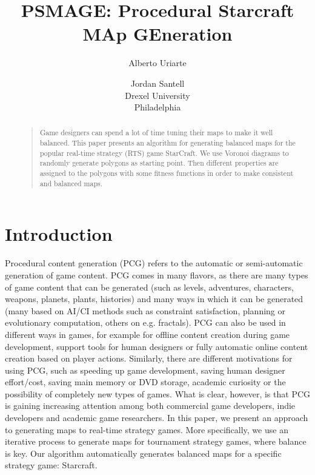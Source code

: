 \documentclass[letterpaper]{article}
\begin{document}
%
\title{PSMAGE: Procedural Starcraft MAp GEneration}
\author{Alberto Uriarte \and Jordan Santell\\
Drexel University\\
Philadelphia\\
}
\maketitle
\begin{abstract}
\begin{quote}
Game designers can spend a lot of time tuning their maps to make it well balanced. This paper presents an algorithm for generating balanced maps for the popular real-time strategy (RTS) game StarCraft. We use Voronoi diagrams to randomly generate polygons as starting point. Then different properties are assigned to the polygons with some fitness functions in order to make consistent and balanced maps.
\end{quote}
\end{abstract}


\section{Introduction} %
\label{sec:introduction}
Procedural content generation (PCG) refers to the automatic or semi-automatic generation of game content. PCG comes in many ﬂavors, as there are many types of game content that can be generated (such as levels, adventures, characters, weapons, planets, plants, histories) and many ways in which it can be generated (many based on AI/CI methods such as constraint satisfaction, planning or evolutionary computation, others on e.g. fractals). PCG can also be used in different ways in games, for example for offline content creation during game development, support tools for human designers or fully automatic online content creation based on player actions. Similarly, there are different motivations for using PCG, such as speeding up game development, saving human designer effort/cost, saving main memory or DVD storage, academic curiosity or the possibility of completely new types of games. What is clear, however, is that PCG is gaining increasing attention among both commercial game developers, indie developers and academic game researchers.
In this paper, we present an approach to generating maps to real-time strategy games. More speciﬁcally, we use an iterative process to generate maps for tournament strategy games, where balance is key. Our algorithm automatically generates balanced maps for a specific strategy game: Starcraft.
\end{document}
